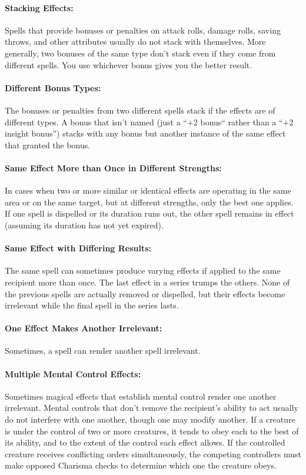 \paragraph{Stacking Effects:} Spells that provide bonuses or penalties on attack rolls, 
damage rolls, saving throws, and other attributes usually do not stack with themselves. 
More generally, two bonuses of the same type don't stack even if they come from different spells. 
You use whichever bonus gives you the better result. 

\paragraph{Different Bonus Types:} The bonuses or penalties from two different spells stack if the effects are of different types. 
A bonus that isn't named (just a ``+2 bonus`` rather than a ``+2 insight bonus'') stacks with any bonus but another instance of the same effect that granted the bonus.

\paragraph{Same Effect More than Once in Different Strengths:} 
In cases when two or more similar or identical effects are operating in the same area or on the same target, but at different strengths, only the best one applies. 
If one spell is dispelled or its duration runs out, the other spell remains in effect (assuming its duration has not yet expired).

\paragraph{Same Effect with Differing Results:} 
The same spell can sometimes produce varying effects if applied to the same recipient more than once. 
The last effect in a series trumps the others. 
None of the previous spells are actually removed or dispelled, but their effects become irrelevant while the final spell in the series lasts.

\paragraph{One Effect Makes Another Irrelevant:} Sometimes, a spell can render another spell irrelevant.

\paragraph{Multiple Mental Control Effects:} Sometimes magical effects that establish mental control render one another irrelevant. 
Mental controls that don't remove the recipient's ability to act usually do not interfere with one another, 
though one may modify another. If a creature is under the control of two or more creatures, 
it tends to obey each to the best of its ability, and to the extent of the control each effect allows. 
If the controlled creature receives conflicting orders simultaneously, 
the competing controllers must make opposed Charisma checks to determine which one the creature obeys.

